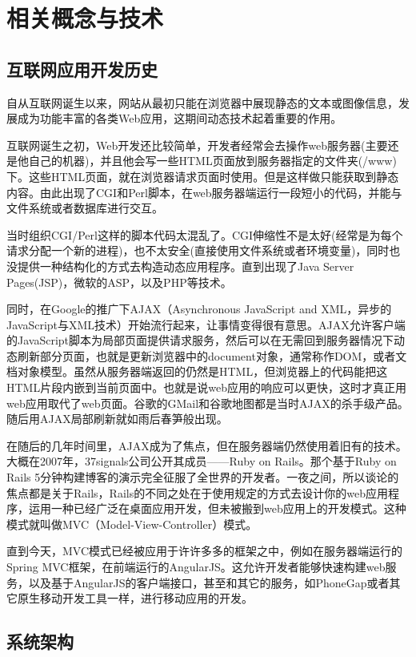 
\chapter{相关概念与技术}
\section{互联网应用开发历史}
自从互联网诞生以来，网站从最初只能在浏览器中展现静态的文本或图像信息，发展成为功能丰富的各类Web应用，这期间动态技术起着重要的作用。

互联网诞生之初，Web开发还比较简单，开发者经常会去操作web服务器(主要还是他自己的机器)，并且他会写一些HTML页面放到服务器指定的文件夹(/www)下。这些HTML页面，就在浏览器请求页面时使用。但是这样做只能获取到静态内容。由此出现了CGI和Perl脚本，在web服务器端运行一段短小的代码，并能与文件系统或者数据库进行交互。

当时组织CGI/Perl这样的脚本代码太混乱了。CGI伸缩性不是太好(经常是为每个请求分配一个新的进程)，也不太安全(直接使用文件系统或者环境变量)，同时也没提供一种结构化的方式去构造动态应用程序。直到出现了Java Server Pages(JSP)，微软的ASP，以及PHP等技术。

同时，在Google的推广下AJAX（Asynchronous JavaScript and XML，异步的JavaScript与XML技术）开始流行起来，让事情变得很有意思。AJAX允许客户端的JavaScript脚本为局部页面提供请求服务，然后可以在无需回到服务器情况下动态刷新部分页面，也就是更新浏览器中的document对象，通常称作DOM，或者文档对象模型。虽然从服务器端返回的仍然是HTML，但浏览器上的代码能把这HTML片段内嵌到当前页面中。也就是说web应用的响应可以更快，这时才真正用web应用取代了web页面。谷歌的GMail和谷歌地图都是当时AJAX的杀手级产品。随后用AJAX局部刷新就如雨后春笋般出现。

在随后的几年时间里，AJAX成为了焦点，但在服务器端仍然使用着旧有的技术。大概在2007年，37signals公司公开其成员——Ruby on Rails。那个基于Ruby on Rails 5分钟构建博客的演示完全征服了全世界的开发者。一夜之间，所以谈论的焦点都是关于Rails，Rails的不同之处在于使用规定的方式去设计你的web应用程序，运用一种已经广泛在桌面应用开发，但未被搬到web应用上的开发模式。这种模式就叫做MVC（Model-View-Controller）模式。

直到今天，MVC模式已经被应用于许许多多的框架之中，例如在服务器端运行的Spring MVC框架，在前端运行的AngularJS。这允许开发者能够快速构建web服务，以及基于AngularJS的客户端接口，甚至和其它的服务，如PhoneGap或者其它原生移动开发工具一样，进行移动应用的开发。

\section{系统架构}
